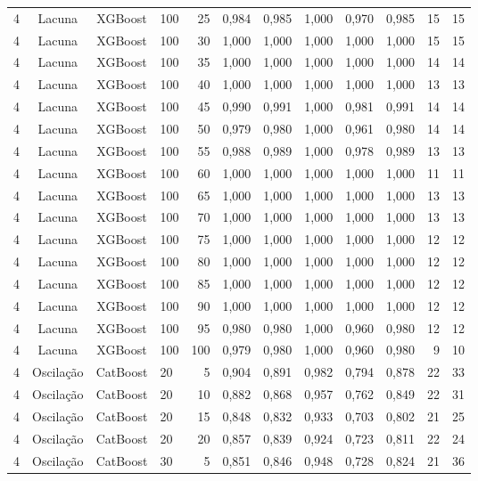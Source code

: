 \begin{longtable}{ccclrrrrrrrr}
4 & Lacuna & XGBoost & 100 & 25 & 0,984 & 0,985 & 1,000 & 0,970 & 0,985 & 15 & 15 \\
4 & Lacuna & XGBoost & 100 & 30 & 1,000 & 1,000 & 1,000 & 1,000 & 1,000 & 15 & 15 \\
4 & Lacuna & XGBoost & 100 & 35 & 1,000 & 1,000 & 1,000 & 1,000 & 1,000 & 14 & 14 \\
4 & Lacuna & XGBoost & 100 & 40 & 1,000 & 1,000 & 1,000 & 1,000 & 1,000 & 13 & 13 \\
4 & Lacuna & XGBoost & 100 & 45 & 0,990 & 0,991 & 1,000 & 0,981 & 0,991 & 14 & 14 \\
4 & Lacuna & XGBoost & 100 & 50 & 0,979 & 0,980 & 1,000 & 0,961 & 0,980 & 14 & 14 \\
4 & Lacuna & XGBoost & 100 & 55 & 0,988 & 0,989 & 1,000 & 0,978 & 0,989 & 13 & 13 \\
4 & Lacuna & XGBoost & 100 & 60 & 1,000 & 1,000 & 1,000 & 1,000 & 1,000 & 11 & 11 \\
4 & Lacuna & XGBoost & 100 & 65 & 1,000 & 1,000 & 1,000 & 1,000 & 1,000 & 13 & 13 \\
4 & Lacuna & XGBoost & 100 & 70 & 1,000 & 1,000 & 1,000 & 1,000 & 1,000 & 13 & 13 \\
4 & Lacuna & XGBoost & 100 & 75 & 1,000 & 1,000 & 1,000 & 1,000 & 1,000 & 12 & 12 \\
4 & Lacuna & XGBoost & 100 & 80 & 1,000 & 1,000 & 1,000 & 1,000 & 1,000 & 12 & 12 \\
4 & Lacuna & XGBoost & 100 & 85 & 1,000 & 1,000 & 1,000 & 1,000 & 1,000 & 12 & 12 \\
4 & Lacuna & XGBoost & 100 & 90 & 1,000 & 1,000 & 1,000 & 1,000 & 1,000 & 12 & 12 \\
4 & Lacuna & XGBoost & 100 & 95 & 0,980 & 0,980 & 1,000 & 0,960 & 0,980 & 12 & 12 \\
4 & Lacuna & XGBoost & 100 & 100 & 0,979 & 0,980 & 1,000 & 0,960 & 0,980 & 9 & 10 \\
4 & Oscilação & CatBoost & 20 & 5 & 0,904 & 0,891 & 0,982 & 0,794 & 0,878 & 22 & 33 \\
4 & Oscilação & CatBoost & 20 & 10 & 0,882 & 0,868 & 0,957 & 0,762 & 0,849 & 22 & 31 \\
4 & Oscilação & CatBoost & 20 & 15 & 0,848 & 0,832 & 0,933 & 0,703 & 0,802 & 21 & 25 \\
4 & Oscilação & CatBoost & 20 & 20 & 0,857 & 0,839 & 0,924 & 0,723 & 0,811 & 22 & 24 \\
4 & Oscilação & CatBoost & 30 & 5 & 0,851 & 0,846 & 0,948 & 0,728 & 0,824 & 21 & 36 \\

\end{longtable}
